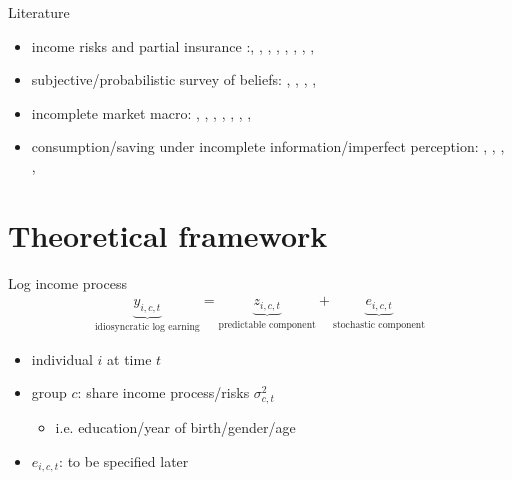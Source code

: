 \documentclass{beamer}
\begin{document}
\begin{frame}{Literature}
	\begin{itemize}
		\item income risks and partial insurance :{\scriptsize\cite{gottschalk1994growth}, \cite{carroll1997nature}, \cite{meghir2004income}, \cite{storesletten2004cyclical}, \cite{blundell_consumption_2008},
		\cite{moffitt2002trends},  \cite{guvenen2014nature},  \cite{arellano2017earnings}, \cite{bloom2018great}}
		\item subjective/probabilistic survey of beliefs: {\scriptsize\cite{manski_measuring_2004}, \cite{delavande2011measuring}, \cite{manski_survey_2018},  \cite{bertrand_people_2001}, \cite{armantier_overview_2017}}
		\item incomplete market macro: {\scriptsize\cite{bewley1976permanent}, 
		 \cite{aiyagari1994uninsured},
		\cite{huggett1996wealth}, \cite{krusell1998income}, \cite{heathcote2009quantitative},  \cite{carroll2017distribution}, \cite{krueger2016macroeconomics},  \cite{bayer2019precautionary}}
		\item consumption/saving under incomplete information/imperfect perception:  {\scriptsize\cite{pischke1995individual}, \cite{wang2004precautionary}, \cite{rozsypal_overpersistence_2017}, \cite{carroll_sticky_2018}, \cite{lian2019imperfect}}
	
	\end{itemize}
\end{frame}


\section{Theoretical framework}

\begin{frame}{Log income process}
	\begin{equation*}
		\begin{split}
			\underbrace{y_{i,c,t}}_{\text{idiosyncratic log earning}} = \underbrace{z_{i,c,t}}_{\text{predictable component}}  + \underbrace{e_{i,c,t}}_{\text{stochastic component}}
		\end{split} 
	\end{equation*}
	
	\begin{itemize}
		\item individual \(i\) at time \(t\) 
		\item group $c$: share income process/risks $\sigma^2_{c,t}$
		\begin{itemize}
			\item i.e. education/year of birth/gender/age
		\end{itemize}
		\item $e_{i,c,t}$: to be specified later
	\end{itemize}
\end{frame}
\end{document}
